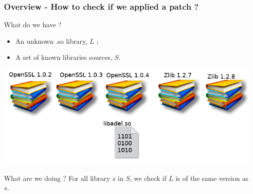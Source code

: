 \documentclass[11pt]{beamer}
\begin{document}
\begin{frame}
    \frametitle{Overview - How to check if we applied a patch ?}
   
    \begin{block}{What do we have ?}
        \begin{itemize}
            \item An unknown .so library, $L$ ;
            \item A set of known libraries sources, $S$.
        \end{itemize}
    \end{block}

    \begin{center}
        \includegraphics[scale=0.3]{bdd.png} 
    \end{center}

    \begin{block}{What are we doing ?}
        For all library $s$ in $S$, we check if $L$ is of the same version as $s$.
    \end{block}
\end{frame}
\end{document}
